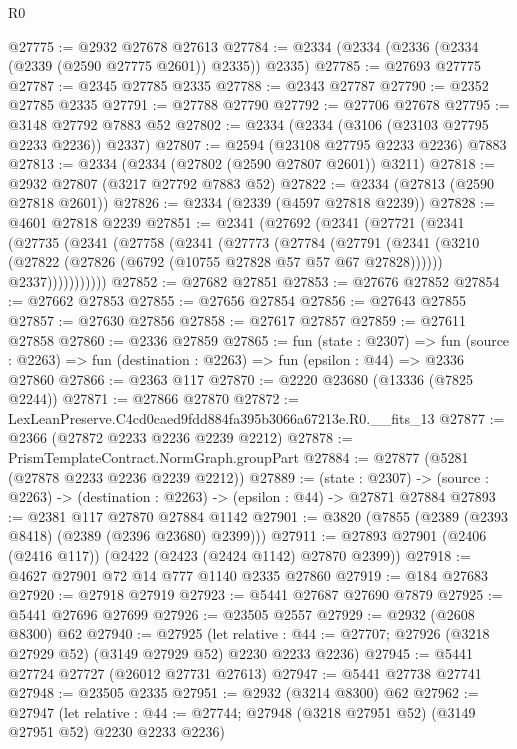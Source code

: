 \begin{lexlean}{R0}
\begin{coremodule}
@27775 := @2932 @27678 @27613
@27784 := @2334 (@2334 (@2336 (@2334 (@2339 (@2590 @27775 @2601)) @2335)) @2335)
@27785 := @27693 @27775
@27787 := @2345 @27785 @2335
@27788 := @2343 @27787
@27790 := @2352 @27785 @2335
@27791 := @27788 @27790
@27792 := @27706 @27678
@27795 := @3148 @27792 @7883 @52
@27802 := @2334 (@2334 (@3106 (@23103 @27795 @2233 @2236)) @2337)
@27807 := @2594 (@23108 @27795 @2233 @2236) @7883
@27813 := @2334 (@2334 (@27802 (@2590 @27807 @2601)) @3211)
@27818 := @2932 @27807 (@3217 @27792 @7883 @52)
@27822 := @2334 (@27813 (@2590 @27818 @2601))
@27826 := @2334 (@2339 (@4597 @27818 @2239))
@27828 := @4601 @27818 @2239
@27851 := @2341
    (@27692
      (@2341
        (@27721
          (@2341
            (@27735
              (@2341
                (@27758
                  (@2341
                    (@27773
                      (@27784
                        (@27791
                          (@2341
                            (@3210 (@27822 (@27826 (@6792 (@10755 @27828 @57 @57 @67 @27828))))))
                          @2337)))))))))))
@27852 := @27682 @27851
@27853 := @27676 @27852
@27854 := @27662 @27853
@27855 := @27656 @27854
@27856 := @27643 @27855
@27857 := @27630 @27856
@27858 := @27617 @27857
@27859 := @27611 @27858
@27860 := @2336 @27859
@27865 := fun (state : @2307) =>
  fun (source : @2263) => fun (destination : @2263) => fun (epsilon : @44) => @2336 @27860
@27866 := @2363 @117
@27870 := @2220 @23680 (@13336 (@7825 @2244))
@27871 := @27866 @27870
@27872 := LexLeanPreserve.C4cd0caed9fdd884fa395b3066a67213e.R0.__fits_13
@27877 := @2366 (@27872 @2233 @2236 @2239 @2212)
@27878 := PrismTemplateContract.NormGraph.groupPart
@27884 := @27877 (@5281 (@27878 @2233 @2236 @2239 @2212))
@27889 := (state : @2307) ->
  (source : @2263) -> (destination : @2263) -> (epsilon : @44) -> @27871 @27884
@27893 := @2381 @117 @27870 @27884 @1142
@27901 := @3820 (@7855 (@2389 (@2393 @8418) (@2389 (@2396 @23680) @2399)))
@27911 := @27893 @27901 (@2406 (@2416 @117)) (@2422 (@2423 (@2424 @1142) @27870 @2399))
@27918 := @4627 @27901 @72 @14 @777 @1140 @2335 @27860
@27919 := @184 @27683
@27920 := @27918 @27919
@27923 := @5441 @27687 @27690 @7879
@27925 := @5441 @27696 @27699
@27926 := @23505 @2557
@27929 := @2932 (@2608 @8300) @62
@27940 := @27925
    (let relative : @44 := @27707; @27926 (@3218 @27929 @52) (@3149 @27929 @52) @2230 @2233 @2236)
@27945 := @5441 @27724 @27727 (@26012 @27731 @27613)
@27947 := @5441 @27738 @27741
@27948 := @23505 @2335
@27951 := @2932 (@3214 @8300) @62
@27962 := @27947
    (let relative : @44 := @27744; @27948 (@3218 @27951 @52) (@3149 @27951 @52) @2230 @2233 @2236)

\end{coremodule}
\end{lexlean}
